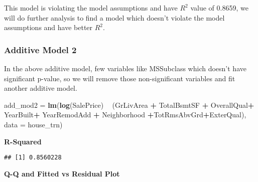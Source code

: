 \documentclass[]{article}
\newenvironment{Shaded}{\begin{snugshade}}{\end{snugshade}}
\newcommand{\KeywordTok}[1]{\textcolor[rgb]{0.13,0.29,0.53}{\textbf{#1}}}
\newcommand{\DataTypeTok}[1]{\textcolor[rgb]{0.13,0.29,0.53}{#1}}
\newcommand{\StringTok}[1]{\textcolor[rgb]{0.31,0.60,0.02}{#1}}
\newcommand{\OperatorTok}[1]{\textcolor[rgb]{0.81,0.36,0.00}{\textbf{#1}}}
\newcommand{\NormalTok}[1]{#1}
\begin{document}
This model is violating the model assumptions and have \(R^2\) value of
0.8659, we will do further analysis to find a model which doesn't
violate the model assumptions and have better \(R^2\).

\subsubsection{Additive Model 2}\label{additive-model-2}

In the above additive model, few variables like MSSubclass which doesn't
have significant p-value, so we will remove those non-significant
variables and fit another additive model.

\begin{Shaded}
\begin{Highlighting}[]
\NormalTok{add_mod2 =}\StringTok{ }\KeywordTok{lm}\NormalTok{(}\KeywordTok{log}\NormalTok{(SalePrice) }\OperatorTok{~}\StringTok{  }\NormalTok{(GrLivArea }\OperatorTok{+}\StringTok{ }\NormalTok{TotalBsmtSF }\OperatorTok{+}\StringTok{ }\NormalTok{OverallQual}\OperatorTok{+}\StringTok{ }\NormalTok{YearBuilt}\OperatorTok{+}\StringTok{ }\NormalTok{YearRemodAdd }\OperatorTok{+}\StringTok{ }\NormalTok{Neighborhood }\OperatorTok{+}\NormalTok{TotRmsAbvGrd}\OperatorTok{+}\NormalTok{ExterQual), }\DataTypeTok{data =}\NormalTok{ house_trn)}
\end{Highlighting}
\end{Shaded}

\textbf{R-Squared}

\begin{Shaded}
\end{Shaded}

\begin{verbatim}
## [1] 0.8560228
\end{verbatim}

\textbf{Q-Q and Fitted vs Residual Plot}
\end{document}
